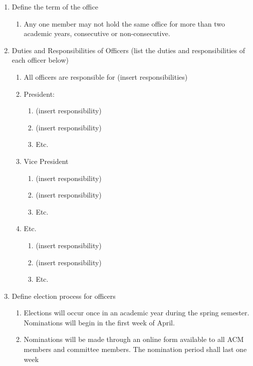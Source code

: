 \documentclass[11pt,a4paper,notitlepage]{article}
\begin{document}
\begin{enumerate}[label=\Alph*.]
  \item Define the term of the office
    \begin{enumerate}[label=\arabic*.]
      \item Any one member may not hold the same office for more than two
      academic years, consecutive or non-consecutive.
    \end{enumerate}
  \item Duties and Responsibilities of Officers (list the duties and
  responsibilities of each officer below)
    \begin{enumerate}[label=\arabic*.]
      \item All officers are responsible for (insert responsibilities)
      \item President:
        \begin{enumerate}[label=\alph*.]
          \item (insert responsibility)
          \item (insert responsibility)
          \item Etc.
        \end{enumerate}
      \item Vice President
        \begin{enumerate}[label=\alph*.]
          \item (insert responsibility)
          \item (insert responsibility)
          \item Etc.
        \end{enumerate}
      \item Etc.
        \begin{enumerate}[label=\alph*.]
          \item (insert responsibility)
          \item (insert responsibility)
          \item Etc.
        \end{enumerate}
    \end{enumerate}
  \item Define election process for officers
    \begin{enumerate}[label=\arabic*.]
      \item Elections will occur once in an academic year during the spring
      semester. Nominations will begin in the first week of April.
      \item Nominations will be made through an online form available to all ACM
      members and committee members. The nomination period shall last one week

\end{enumerate}
\end{enumerate}
\end{document}
